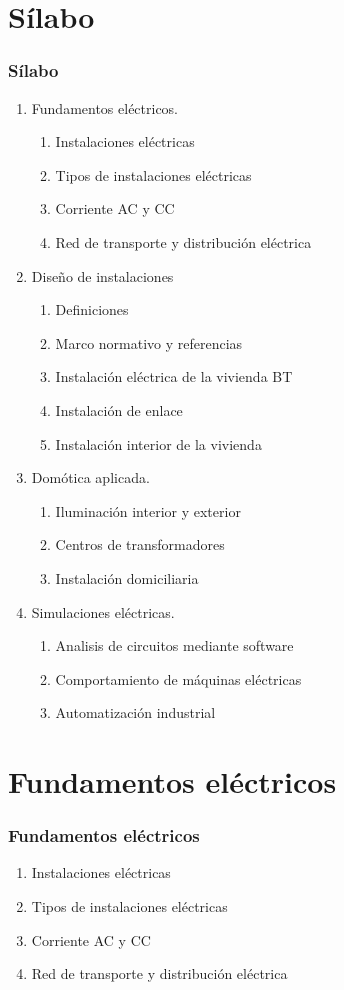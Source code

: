 \documentclass[xcolor=dvipsnames,envcountsect]{beamer}
\begin{document}
\section{Sílabo}
\begin{frame}
	\frametitle{Sílabo}
		\justifying
		\begin{enumerate}
		\item Fundamentos eléctricos.
			\begin{enumerate}
			\item Instalaciones eléctricas
			\item Tipos de instalaciones eléctricas
			\item Corriente AC y CC
			\item Red de transporte y distribución eléctrica
			\end{enumerate}
		\item Diseño de instalaciones
			\begin{enumerate}
			\item Definiciones
			\item Marco normativo y referencias
			\item Instalación eléctrica de la vivienda BT
			\item Instalación de enlace
			\item Instalación interior de la vivienda
			\end{enumerate}
		\item Domótica aplicada.
			\begin{enumerate}
			\item Iluminación interior y exterior
			\item Centros de transformadores
			\item Instalación domiciliaria
			\end{enumerate}
		\item Simulaciones eléctricas.
			\begin{enumerate}
			\item Analisis de circuitos mediante software
			\item Comportamiento de máquinas eléctricas
			\item Automatización industrial 
			\end{enumerate}
		\end{enumerate}
\end{frame}



\section{Fundamentos eléctricos}
\begin{frame}
	\frametitle{Fundamentos eléctricos}
		\justifying
		\begin{enumerate}
			\item Instalaciones eléctricas
			\item Tipos de instalaciones eléctricas
			\item Corriente AC y CC
			\item Red de transporte y distribución eléctrica
		\end{enumerate}
\end{frame}
\end{document}

